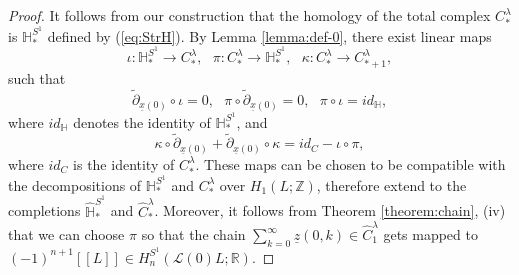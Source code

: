 \documentclass[a4paper]{article}
\numberwithin{equation}{section}
\begin{document}
\begin{proof}
It follows from our construction that the homology of the total complex $C_\ast^\lambda$ is $\mathbb{H}_\ast^{S^1}$ defined by (\ref{eq:StrH}). By Lemma \ref{lemma:def-0}, there exist linear maps
\begin{equation}
\iota:\mathbb{H}_\ast^{S^1}\rightarrow C_\ast^\lambda,\textrm{ }\pi:C_\ast^\lambda\rightarrow\mathbb{H}_\ast^{S^1},\textrm{ }\kappa:C_\ast^\lambda\rightarrow C_{\ast+1}^\lambda,
\end{equation}
such that
\begin{equation}
\tilde{\partial}_{\underline{x}(0)}\circ\iota=0,\textrm{ }\pi\circ\tilde{\partial}_{\underline{x}(0)}=0,\textrm{ }\pi\circ\iota=\mathit{id}_\mathbb{H},
\end{equation}
where $\mathit{id}_\mathbb{H}$ denotes the identity of $\mathbb{H}_\ast^{S^1}$, and
\begin{equation}
\kappa\circ\tilde{\partial}_{\underline{x}(0)}+\tilde{\partial}_{\underline{x}(0)}\circ\kappa=\mathit{id}_C-\iota\circ\pi,
\end{equation}
where $\mathit{id}_C$ is the identity of $C_\ast^\lambda$. These maps can be chosen to be compatible with the decompositions of $\mathbb{H}_\ast^{S^1}$ and $C_\ast^\lambda$ over $H_1(L;\mathbb{Z})$, therefore extend to the completions $\widehat{\mathbb{H}}^{S^1}_\ast$ and $\widehat{C}_\ast^\lambda$. Moreover, it follows from Theorem \ref{theorem:chain}, (iv) that we can choose $\pi$ so that the chain $\sum_{k=0}^\infty\underline{z}(0,k)\in\widehat{C}_1^\lambda$ gets mapped to $(-1)^{n+1}[\![L]\!]\in H_n^{S^1}(\mathcal{L}(0)L;\mathbb{R})$.


\end{proof}
\end{document}
